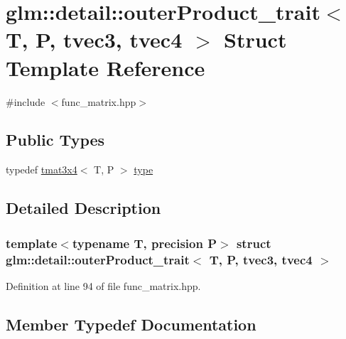 \hypertarget{structglm_1_1detail_1_1outer_product__trait_3_01_t_00_01_p_00_01tvec3_00_01tvec4_01_4}{}\section{glm\+:\+:detail\+:\+:outer\+Product\+\_\+trait$<$ T, P, tvec3, tvec4 $>$ Struct Template Reference}
\label{structglm_1_1detail_1_1outer_product__trait_3_01_t_00_01_p_00_01tvec3_00_01tvec4_01_4}


{\ttfamily \#include $<$func\+\_\+matrix.\+hpp$>$}

\subsection*{Public Types}
\begin{DoxyCompactItemize}
\item 
typedef \hyperlink{structglm_1_1detail_1_1tmat3x4}{tmat3x4}$<$ T, P $>$ \hyperlink{structglm_1_1detail_1_1outer_product__trait_3_01_t_00_01_p_00_01tvec3_00_01tvec4_01_4_a14958bc1241fffaf223abab70496c56d}{type}
\end{DoxyCompactItemize}


\subsection{Detailed Description}
\subsubsection*{template$<$typename T, precision P$>$\newline
struct glm\+::detail\+::outer\+Product\+\_\+trait$<$ T, P, tvec3, tvec4 $>$}



Definition at line 94 of file func\+\_\+matrix.\+hpp.



\subsection{Member Typedef Documentation}
\mbox{\label{structglm_1_1detail_1_1outer_product__trait_3_01_t_00_01_p_00_01tvec3_00_01tvec4_01_4_a14958bc1241fffaf223abab70496c56d}} 

